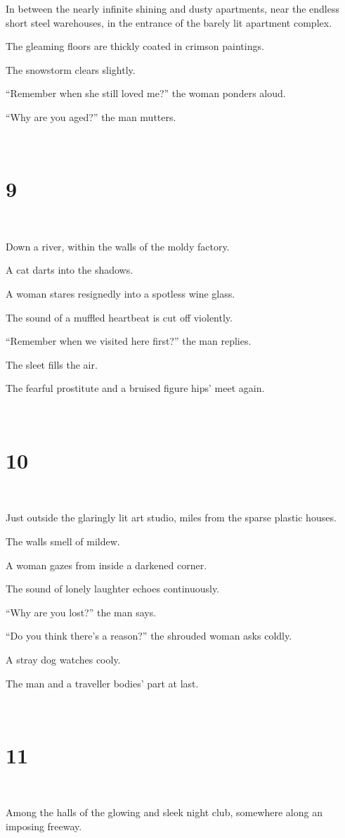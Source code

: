 \documentclass{report}
\begin{document}
In between the nearly infinite shining and dusty apartments, near the endless short steel warehouses, in the entrance of the barely lit apartment complex.

The gleaming floors are thickly coated in crimson paintings.

The snowstorm clears slightly.

``Remember when she still loved me?'' the woman ponders aloud.

``Why are you aged?'' the man mutters.

~
\chapter*{9}
~

Down a river, within the walls of the moldy factory.

A cat darts into the shadows.

A woman stares resignedly into a spotless wine glass.

The sound of a muffled heartbeat is cut off violently.

``Remember when we visited here first?'' the man replies.

The sleet fills the air.

The fearful prostitute and a bruised figure hips' meet again.

~
\chapter*{10}
~

Just outside the glaringly lit art studio, miles from the sparse plastic houses.

The walls smell of mildew.

A woman gazes from inside a darkened corner.

The sound of lonely laughter echoes continuously.

``Why are you lost?'' the man says.

``Do you think there's a reason?'' the shrouded woman asks coldly.

A stray dog watches cooly.

The man and a traveller bodies' part at last.

~
\chapter*{11}
~

Among the halls of the glowing and sleek night club, somewhere along an imposing freeway.
\end{document}
